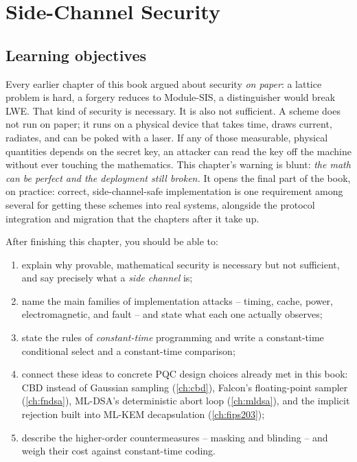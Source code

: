 \chapter{Side-Channel Security}
\label{ch:sidechannel}

\section{Learning objectives}

Every earlier chapter of this book argued about security \emph{on paper}: a lattice
problem is hard, a forgery reduces to Module-SIS, a distinguisher would break LWE.
That kind of security is necessary. It is also not sufficient. A scheme does not run
on paper; it runs on a physical device that takes time, draws current, radiates,
and can be poked with a laser. If any of those measurable, physical quantities
depends on the secret key, an attacker can read the key off the machine without ever
touching the mathematics. This chapter's warning is blunt:
\emph{the math can be perfect and the deployment still broken.} It opens the final part
of the book, on practice: correct, side-channel-safe implementation is one requirement
among several for getting these schemes into real systems, alongside the protocol
integration and migration that the chapters after it take up.

After finishing this chapter, you should be able to:

\begin{enumerate}
  \item explain why provable, mathematical security is necessary but not sufficient,
        and say precisely what a \emph{side channel} is;
  \item name the main families of implementation attacks -- timing, cache, power,
        electromagnetic, and fault -- and state what each one actually observes;
  \item state the rules of \emph{constant-time} programming and write a constant-time
        conditional select and a constant-time comparison;
  \item connect these ideas to concrete PQC design choices already met in this book:
        CBD instead of Gaussian sampling (\ref{ch:cbd}), Falcon's floating-point
        sampler (\ref{ch:fndsa}), ML-DSA's deterministic abort loop (\ref{ch:mldsa}),
        and the implicit rejection built into ML-KEM decapsulation (\ref{ch:fips203});
  \item describe the higher-order countermeasures -- masking and blinding -- and
        weigh their cost against constant-time coding.
\end{enumerate}

